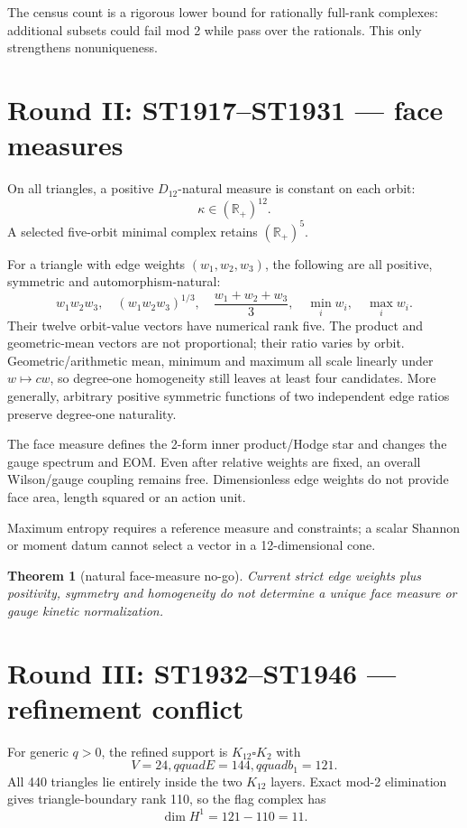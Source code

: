 \documentclass[11pt,a4paper]{article}
\newtheorem{theorem}{Theorem}\newcommand{\status}[1]{\textsf{[#1]}}
\begin{document}
The census count is a rigorous lower bound for rationally full-rank complexes:
additional subsets could fail mod 2 while pass over the rationals.  This only
strengthens nonuniqueness.

\section{Round II: ST1917--ST1931 --- face measures}

On all triangles, a positive $D_{12}$-natural measure is constant on each orbit:
\[
\kappa\in(\mathbb R_+)^{12}.
\]
A selected five-orbit minimal complex retains $(\mathbb R_+)^5$.

For a triangle with edge weights $(w_1,w_2,w_3)$, the following are all
positive, symmetric and automorphism-natural:
\[
w_1w_2w_3,\quad(w_1w_2w_3)^{1/3},\quad
\frac{w_1+w_2+w_3}{3},\quad\min_iw_i,\quad\max_iw_i.
\]
Their twelve orbit-value vectors have numerical rank five.  The product and
geometric-mean vectors are not proportional; their ratio varies by orbit.
Geometric/arithmetic mean, minimum and maximum all scale linearly under
$w\mapsto cw$, so degree-one homogeneity still leaves at least four candidates.
More generally, arbitrary positive symmetric functions of two independent edge
ratios preserve degree-one naturality.

The face measure defines the 2-form inner product/Hodge star and changes the
gauge spectrum and EOM.  Even after relative weights are fixed, an overall
Wilson/gauge coupling remains free.  Dimensionless edge weights do not provide
face area, length squared or an action unit.

Maximum entropy requires a reference measure and constraints; a scalar Shannon
or moment datum cannot select a vector in a 12-dimensional cone.

\begin{theorem}[natural face-measure no-go]
Current strict edge weights plus positivity, symmetry and homogeneity do not
determine a unique face measure or gauge kinetic normalization.
\end{theorem}

\section{Round III: ST1932--ST1946 --- refinement conflict}

For generic $q>0$, the refined support is $K_{12}\square K_2$ with
\[
V=24,qquad E=144,qquad b_1=121.
\]
All 440 triangles lie entirely inside the two $K_{12}$ layers.  Exact mod-2
elimination gives triangle-boundary rank 110, so the flag complex has
\[
\dim H^1=121-110=11.
\]
\end{document}
